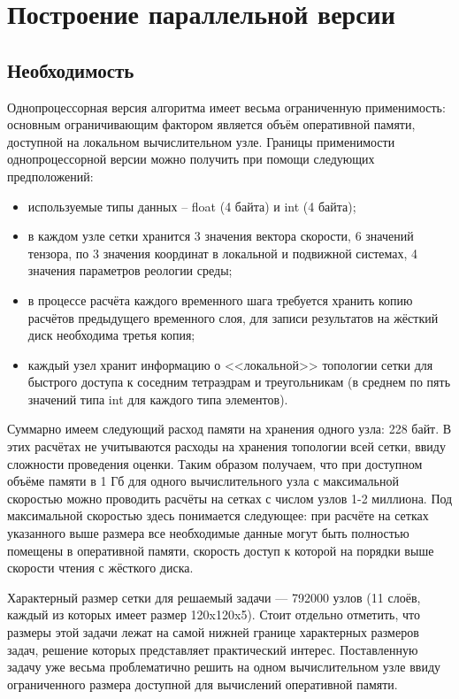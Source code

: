 \section{Построение параллельной версии}
\subsection{Необходимость}
Однопроцессорная версия алгоритма имеет весьма ограниченную применимость: основным ограничивающим фактором является объём оперативной памяти, доступной на локальном вычислительном узле. Границы применимости однопроцессорной версии можно получить при помощи следующих предположений:
\begin{itemize}
	\item используемые типы данных -- float (4 байта) и int (4 байта);
	\item в каждом узле сетки хранится 3 значения вектора скорости, 6 значений тензора, по 3 значения координат в локальной и подвижной системах, 4 значения параметров реологии среды;
	\item в процессе расчёта каждого временного шага требуется хранить копию расчётов предыдущего временного слоя, для записи результатов на жёсткий диск необходима третья копия;
	\item каждый узел хранит информацию о <<локальной>> топологии сетки для быстрого доступа к соседним тетраэдрам и треугольникам (в среднем по пять значений типа int для каждого типа элементов).
\end{itemize}

Суммарно имеем следующий расход памяти на хранения одного узла: 228 байт. В этих расчётах не учитываются расходы на хранения топологии всей сетки, ввиду сложности проведения оценки. Таким образом получаем, что при доступном объёме памяти в 1 Гб для одного вычислительного узла с максимальной скоростью можно проводить расчёты на сетках с числом узлов 1-2 миллиона. Под максимальной скоростью здесь понимается следующее: при расчёте на сетках указанного выше размера все необходимые данные могут быть полностью помещены в оперативной памяти, скорость доступ к которой на порядки выше скорости чтения с жёсткого диска.

Характерный размер сетки для решаемый задачи —  792000 узлов (11 слоёв, каждый из которых имеет размер 120x120x5). Стоит отдельно отметить, что размеры этой задачи лежат на самой нижней границе характерных размеров задач, решение которых представляет практический интерес. Поставленную задачу уже весьма проблематично решить на одном вычислительном узле ввиду ограниченного размера доступной для вычислений оперативной памяти.

